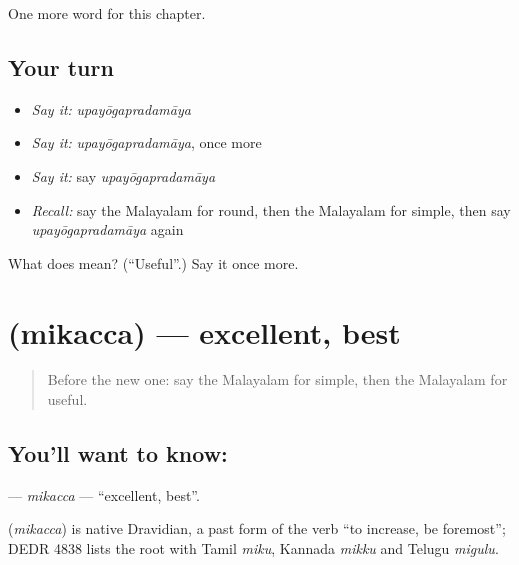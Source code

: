 \begin{grammarlens}[title={What you've built}]
One more word for this chapter.
\end{grammarlens}

\subsection*{Your turn}
\begin{itemize}
\raggedright
  \item \emph{Say it:} \emph{upayōgapradamāya}
  \item \emph{Say it:} \emph{upayōgapradamāya}, once more
  \item \emph{Say it:} say \emph{upayōgapradamāya}
  \item \emph{Recall:} say the Malayalam for round, then the Malayalam for simple, then say \emph{upayōgapradamāya} again
\end{itemize}

\begin{tcolorbox}[breakable,colback=teal!4,colframe=teal!35!black,title={Before you move on}]
What does  mean? (\textquotedblleft{}Useful\textquotedblright{}.) Say it once more.
\end{tcolorbox}
\section[\texorpdfstring{\ml{മികച്ച} (mikacca)}{മികച്ച (mikacca)}]{ (mikacca) — excellent, best}

\label{lesson:ML-C205-mikacca}



\begin{quote}
Before the new one: say the Malayalam for simple, then the Malayalam for useful.
\end{quote}

\subsection*{You'll want to know: }
\textbf{} — \emph{mikacca} — \textquotedblleft{}excellent, best\textquotedblright{}.

\begin{cousinweb}
\textbf{} (\emph{mikacca}) is native Dravidian, a past form of the verb \textquotedblleft{}to increase, be foremost\textquotedblright{}; DEDR 4838 lists the root with Tamil \emph{miku}, Kannada \emph{mikku} and Telugu \emph{migulu}.
\end{cousinweb}

